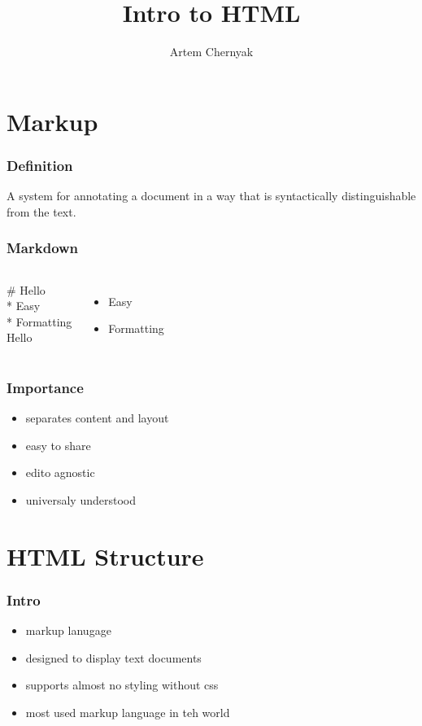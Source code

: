 \documentclass{beamer}
\begin{document}
\title{Intro to HTML}
\author{Artem Chernyak}

\frame{\titlepage}


\section[Section]{Markup}

\begin{frame}
  \frametitle{Definition}
  A system for annotating a document in a way that is syntactically
  distinguishable from the text.
\end{frame}

\begin{frame}
  \frametitle{Markdown}
  \begin{columns}
    \# Hello\\
    \bigskip
    * Easy\\
    * Formatting\\
    {\huge Hello}
    \begin{itemize}
      \item Easy
      \item Formatting
    \end{itemize}
  \end{columns}
\end{frame}

\begin{frame}
  \frametitle{Importance}
  \begin{itemize}
    \item separates content and layout
    \item easy to share
    \item edito agnostic
    \item universaly understood
  \end{itemize}
\end{frame}

\section[Section]{HTML Structure}

\begin{frame}
  \frametitle{Intro}
  \begin{itemize}
    \item markup lanugage
    \item designed to display text documents
    \item supports almost no styling without css
    \item most used markup language in teh world
  \end{itemize}
\end{frame}
\end{document}
